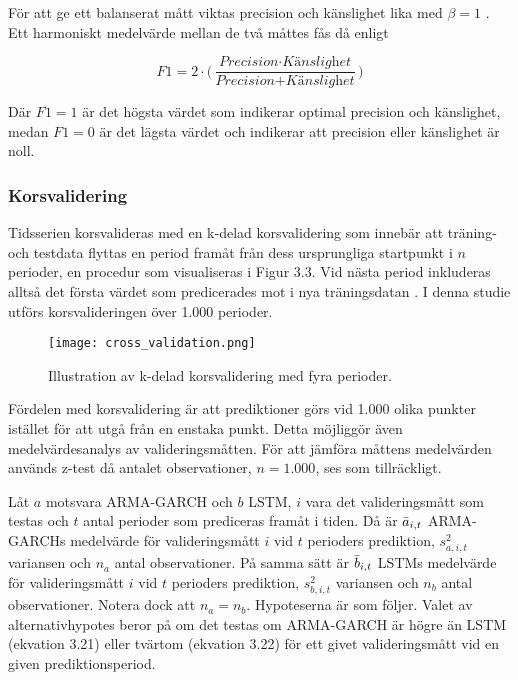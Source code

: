 \documentclass[11pt]{article}
\numberwithin{equation}{section}
\numberwithin{table}{section}
\numberwithin{figure}{section}
\begin{document}
För att ge ett balanserat mått viktas precision och känslighet lika med $\beta=1$ \parencite{ModelValidation}. Ett harmoniskt medelvärde mellan de två måttes fås då enligt

\begin{equation}
    \textit{F1} = 2 \cdot \Big( \frac{\textit{Precision} \cdot \textit{Känslighet}}{\textit{Precision} + \textit{Känslighet}} \Big)
\end{equation}

Där $F1=1$ är det högsta värdet som indikerar optimal precision och känslighet, medan $F1=0$ är det lägsta värdet och indikerar att precision eller känslighet är noll.


\subsubsection{Korsvalidering}
Tidsserien korsvalideras med en k-delad korsvalidering som innebär att träning- och testdata flyttas en period framåt från dess ursprungliga startpunkt i $n$ perioder, en procedur som visualiseras i Figur 3.3. Vid nästa period inkluderas alltså det första värdet som predicerades mot i nya träningsdatan \parencite{bergmeir2018note}. I denna studie utförs korsvalideringen över 1.000 perioder. 

\begin{figure}[H]
\caption{Illustration av k-delad korsvalidering med fyra perioder.}
\texttt{[image: cross\_validation.png]}
\centering
\end{figure}


Fördelen med korsvalidering är att prediktioner görs vid 1.000 olika punkter istället för att utgå från en enstaka punkt. Detta möjliggör även medelvärdesanalys av valideringsmåtten. För att jämföra måttens medelvärden används z-test då antalet observationer, $n=1.000$, ses som tillräckligt.

Låt $a$ motsvara ARMA-GARCH och $b$ LSTM, $i$ vara det valideringsmått som testas och $t$ antal perioder som prediceras framåt i tiden. Då är $\Bar{a}_{i,t}$ ARMA-GARCHs medelvärde för valideringsmått $i$ vid $t$ perioders prediktion, $s_{a,i,t}^2$ variansen och $n_a$ antal observationer. På samma sätt är  $\Bar{b}_{i,t}$ LSTMs medelvärde för valideringsmått $i$ vid $t$ perioders prediktion, $s_{b,i,t}^2$ variansen och $n_b$ antal observationer. Notera dock att $n_a = n_b$. Hypoteserna är som följer. Valet av alternativhypotes beror på om det testas om ARMA-GARCH är högre än LSTM (ekvation 3.21) eller tvärtom (ekvation 3.22) för ett givet valideringsmått vid en given prediktionsperiod. 
\end{document}
